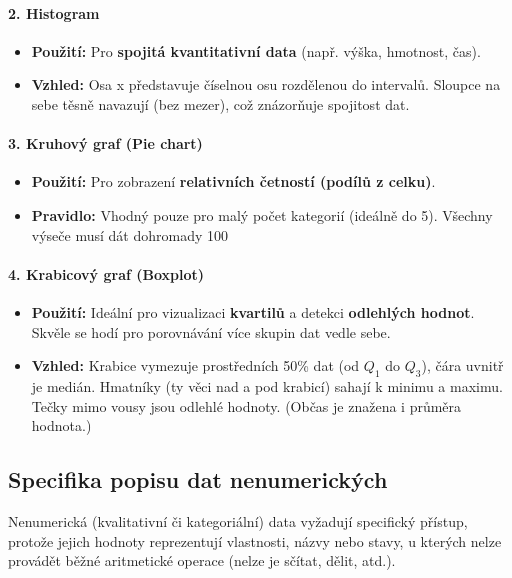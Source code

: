 \paragraph*{2. Histogram}
\begin{itemize}
\item \textbf{Použití:} Pro \textbf{spojitá kvantitativní data} (např. výška, hmotnost, čas).
\item \textbf{Vzhled:} Osa x představuje číselnou osu rozdělenou do intervalů. Sloupce na sebe těsně navazují (bez mezer), což znázorňuje spojitost dat.
\end{itemize}

\paragraph*{3. Kruhový graf (Pie chart)}
\begin{itemize}
\item \textbf{Použití:} Pro zobrazení \textbf{relativních četností (podílů z celku)}.
\item \textbf{Pravidlo:} Vhodný pouze pro malý počet kategorií (ideálně do 5). Všechny výseče musí dát dohromady 100 %
\end{itemize}

\paragraph*{4. Krabicový graf (Boxplot)}
\begin{itemize}
\item \textbf{Použití:} Ideální pro vizualizaci \textbf{kvartilů} a detekci \textbf{odlehlých hodnot}. Skvěle se hodí pro porovnávání více skupin dat vedle sebe.
\item \textbf{Vzhled:} Krabice vymezuje prostředních 50\% dat (od $Q_1$ do $Q_3$), čára uvnitř je medián. Hmatníky (ty věci nad a pod krabicí) sahají k minimu a maximu. Tečky mimo vousy jsou odlehlé hodnoty. (Občas je znažena i průměra hodnota.)
\end{itemize}


\subsection{Specifika popisu dat nenumerických}
Nenumerická (kvalitativní či kategoriální) data vyžadují specifický přístup, protože jejich hodnoty reprezentují vlastnosti, názvy nebo stavy, u kterých nelze provádět běžné aritmetické operace (nelze je sčítat, dělit, atd.).

